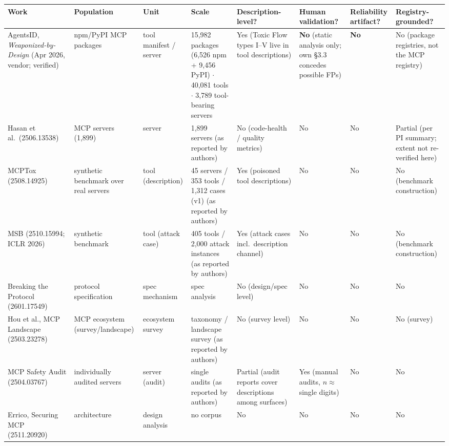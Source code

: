 \documentclass[10pt,conference]{IEEEtran}
\begin{document}
\begin{table}[!t]
\centering
\scriptsize
\begin{tabular}{@{}p{}p{}p{}p{}p{}p{}p{}p{}@{}}
\toprule
Work & Population & Unit & Scale & Description-level? & Human validation? & Reliability artifact? & Registry-grounded? \\
\midrule
AgentsID, \emph{Weaponized-by-Design} (Apr 2026, vendor; verified)~\cite{agentsid} &
  npm/PyPI MCP packages & tool manifest / server &
  15,982 packages (6,526 npm + 9,456 PyPI) $\cdot$ 40,081 tools $\cdot$ 3,789 tool-bearing servers &
  Yes (Toxic Flow types I--V live in tool descriptions) &
  \textbf{No} (static analysis only; own \S3.3 concedes possible FPs) &
  \textbf{No} & No (package registries, not the MCP registry) \\
Hasan et al.\ (2506.13538)~\cite{hasan} & MCP servers (1,899) & server &
  1,899 servers (as reported by authors) & No (code-health / quality metrics) & No & No &
  Partial (per PI summary; extent not re-verified here) \\
MCPTox (2508.14925)~\cite{mcptox} & synthetic benchmark over real servers & tool (description) &
  45 servers / 353 tools / 1,312 cases (v1) (as reported by authors) &
  Yes (poisoned tool descriptions) & No & No & No (benchmark construction) \\
MSB (2510.15994; ICLR 2026)~\cite{msb} & synthetic benchmark & tool (attack case) &
  405 tools / 2,000 attack instances (as reported by authors) &
  Yes (attack cases incl.\ description channel) & No & No & No (benchmark construction) \\
Breaking the Protocol (2601.17549)~\cite{protocol} & protocol specification & spec mechanism &
  spec analysis & No (design/spec level) & No & No & No \\
Hou et al., MCP Landscape (2503.23278)~\cite{hou} & MCP ecosystem (survey/landscape) &
  ecosystem survey & taxonomy / landscape survey (as reported by authors) &
  No (survey level) & No & No & No (survey) \\
MCP Safety Audit (2504.03767)~\cite{audit} & individually audited servers & server (audit) &
  single audits (as reported by authors) & Partial (audit reports cover descriptions among surfaces) &
  Yes (manual audits, $n \approx$ single digits) & No & No \\
Errico, Securing MCP (2511.20920)~\cite{errico} & architecture & design analysis &
  no corpus & No & No & No & No \\

\end{tabular}
\end{table}
\end{document}
